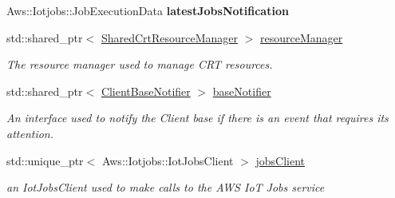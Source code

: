 \begin{DoxyCompactItemize}
\mbox{\label{class_aws_1_1_iot_1_1_device_client_1_1_jobs_1_1_jobs_feature_a96f7c2f34ed5fefb690f51fbc94f00e5}} 
Aws\+::\+Iotjobs\+::\+Job\+Execution\+Data {\bfseries latest\+Jobs\+Notification}
\item 
\mbox{\label{class_aws_1_1_iot_1_1_device_client_1_1_jobs_1_1_jobs_feature_ab798b4c4f1f9790ff6b92002bf13533f}} 
std\+::shared\+\_\+ptr$<$ \hyperlink{class_aws_1_1_iot_1_1_device_client_1_1_shared_crt_resource_manager}{Shared\+Crt\+Resource\+Manager} $>$ \hyperlink{class_aws_1_1_iot_1_1_device_client_1_1_jobs_1_1_jobs_feature_ab798b4c4f1f9790ff6b92002bf13533f}{resource\+Manager}
\begin{DoxyCompactList}\small\item\em The resource manager used to manage C\+RT resources. \end{DoxyCompactList}\item 
\mbox{\label{class_aws_1_1_iot_1_1_device_client_1_1_jobs_1_1_jobs_feature_a2f7ddca3946641f18591475b0072044d}} 
std\+::shared\+\_\+ptr$<$ \hyperlink{class_aws_1_1_iot_1_1_device_client_1_1_client_base_notifier}{Client\+Base\+Notifier} $>$ \hyperlink{class_aws_1_1_iot_1_1_device_client_1_1_jobs_1_1_jobs_feature_a2f7ddca3946641f18591475b0072044d}{base\+Notifier}
\begin{DoxyCompactList}\small\item\em An interface used to notify the Client base if there is an event that requires its attention. \end{DoxyCompactList}\item 
\mbox{\label{class_aws_1_1_iot_1_1_device_client_1_1_jobs_1_1_jobs_feature_a3e1943f1c6c221953e2d6dd884adcb0d}} 
std\+::unique\+\_\+ptr$<$ Aws\+::\+Iotjobs\+::\+Iot\+Jobs\+Client $>$ \hyperlink{class_aws_1_1_iot_1_1_device_client_1_1_jobs_1_1_jobs_feature_a3e1943f1c6c221953e2d6dd884adcb0d}{jobs\+Client}
\begin{DoxyCompactList}\small\item\em an Iot\+Jobs\+Client used to make calls to the A\+WS IoT Jobs service \end{DoxyCompactList}\item 

\end{DoxyCompactItemize}
